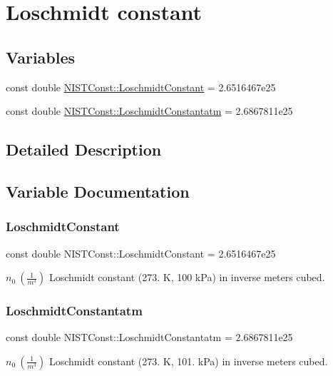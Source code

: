 \hypertarget{group___loschmidt_constant}{}\section{Loschmidt constant}
\label{group___loschmidt_constant}
\subsection*{Variables}
\begin{DoxyCompactItemize}
\item 
const double \hyperlink{group___loschmidt_constant_gab4ddc03e855109d251efa0ae9e8fb80d}{N\+I\+S\+T\+Const\+::\+Loschmidt\+Constant} = 2.\+6516467e25
\item 
const double \hyperlink{group___loschmidt_constant_ga1442f26c5c9f899f74ef7b546a41c461}{N\+I\+S\+T\+Const\+::\+Loschmidt\+Constantatm} = 2.\+6867811e25
\end{DoxyCompactItemize}


\subsection{Detailed Description}


\subsection{Variable Documentation}
\mbox{\label{group___loschmidt_constant_gab4ddc03e855109d251efa0ae9e8fb80d}} 
\subsubsection{\texorpdfstring{Loschmidt\+Constant}{LoschmidtConstant}}
{\footnotesize\ttfamily const double N\+I\+S\+T\+Const\+::\+Loschmidt\+Constant = 2.\+6516467e25}

$n_0 \ (\frac{1}{m^3})$ Loschmidt constant (273. K, 100 k\+Pa) in inverse meters cubed. \mbox{\label{group___loschmidt_constant_ga1442f26c5c9f899f74ef7b546a41c461}} 
\subsubsection{\texorpdfstring{Loschmidt\+Constantatm}{LoschmidtConstantatm}}
{\footnotesize\ttfamily const double N\+I\+S\+T\+Const\+::\+Loschmidt\+Constantatm = 2.\+6867811e25}

$n_0 \ (\frac{1}{m^3})$ Loschmidt constant (273. K, 101. k\+Pa) in inverse meters cubed. 